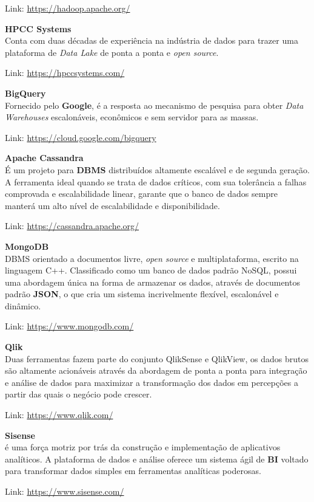 \documentclass[fleqn,10pt]{SelfArx} %
\begin{document}
Link: \url{https://hadoop.apache.org/}

\textbf{HPCC Systems} \\
Conta com duas décadas de experiência na indústria de dados para trazer uma plataforma de \textit{Data Lake} de ponta a ponta e \textit{open source}.

Link: \url{https://hpccsystems.com/}

\textbf{BigQuery} \\
Fornecido pelo \textbf{Google}, é a resposta ao mecanismo de pesquisa para obter \textit{Data Warehouses} escalonáveis, econômicos e sem servidor para as massas.

Link: \url{https://cloud.google.com/bigquery}

\textbf{Apache Cassandra} \\
É um projeto para \textbf{DBMS} distribuídos altamente escalável e de segunda geração. A ferramenta ideal quando se trata de dados críticos, com sua tolerância a falhas comprovada e escalabilidade linear, garante que o banco de dados sempre manterá um alto nível de escalabilidade e disponibilidade.

Link: \url{https://cassandra.apache.org/}

\textbf{MongoDB} \\
DBMS orientado a documentos livre, \textit{open source} e multiplataforma, escrito na linguagem C++. Classificado como um banco de dados padrão NoSQL, possui uma abordagem única na forma de armazenar os dados, através de documentos padrão \textbf{JSON}, o que cria um sistema incrivelmente flexível, escalonável e dinâmico.

Link: \url{https://www.mongodb.com/}

\textbf{Qlik} \\
Duas ferramentas fazem parte do conjunto QlikSense e QlikView, os dados brutos são altamente acionáveis através da abordagem de ponta a ponta para integração e análise de dados para maximizar a transformação dos dados em percepções a partir das quais o negócio pode crescer.

Link: \url{https://www.qlik.com/}

\textbf{Sisense} \\
é uma força motriz por trás da construção e implementação de aplicativos analíticos. A plataforma de dados e análise oferece um sistema ágil de \textbf{BI} voltado para transformar dados simples em ferramentas analíticas poderosas.

Link: \url{https://www.sisense.com/}
\end{document}
